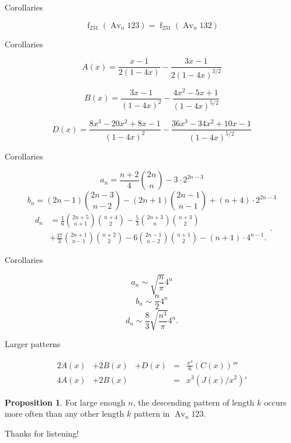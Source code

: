 \documentclass[xcolor=dvipsnames]{beamer}
\newcommand{\Avn}{\Av_n   123 }
\DeclareMathOperator{\Av}{Av}
\DeclareMathOperator{\num}{f}
\theoremstyle{definition}            %
\newtheorem*{proposition}{Proposition}
\begin{document}
\begin{frame}{Corollaries}
  \pause
  \begin{corollary}
    $$ \num_{231}(\Avn) = \num_{231}(\Av_n 132)$$
  \end{corollary}
\end{frame}


\begin{frame}{Corollaries}

    $$ A(x) = \frac{x-1}{2(1-4x)} - \frac{3x-1}{2(1-4x)^{3/2}}$$

    $$B(x) = \frac{3x-1}{(1-4x)^{2}} - \frac{4x^2 - 5x +
    1}{(1-4x)^{5/2}}$$

    $$ D(x) =   \frac{ 8x^3 - 20x^2 + 8x - 1}{(1-4x)^{2}} 
      - \frac{36x^3 - 34x^2 + 10x - 1}{(1-4x)^{5/2}} $$ 

\end{frame}




\begin{frame}{Corollaries}

    $$ a_n = \frac{n+2}{4} \binom{2n}{n} - 3 \cdot 2^{2n-3} $$
    \pause
    $$ b_n = (2n-1) \binom{2n-3}{n-2} - (2n+1)\binom{2n-1}{n-1} + 
       (n+4) \cdot 2^{2n-3}$$
    \pause
    $$ \begin{aligned} d_n 
        &= \frac{1}{6} \binom{2n+5}{n+1} \binom{n+4}{2} 
        - \frac{5}{3} \binom{2n+3}{n} \binom{n+3}{2} \\
        &+ \frac{17}{3} \binom{2n+1}{n-1} \binom{n+2}{2} 
        - 6\binom{2n-1}{n-2} \binom{n+1}{2} - (n+1) \cdot 4^{n-1}.
      \end{aligned}
    .$$

\end{frame}


\begin{frame}{Corollaries}

  $$ a_n \sim \sqrt{\frac{n}{\pi}} 4^n$$
  $$ b_n \sim \frac{n}{2} 4^n $$
  $$ d_n \sim \frac{8}{3} \sqrt{\frac{n^3}{\pi}} 4^n. $$

\end{frame}


\begin{frame}{Larger patterns}
  \pause
  \begin{lemma}
    $$ \begin{array}{ccccc}
      2A(x) & + 2B(x) & + D(x) & = & \frac{x^3}{6} (C(x))'''\\
      4A(x) & + 2B(x) & & =&  x^3(J(x)/x^2)' 
      \end{array} $$
  \end{lemma}
  \pause
  \begin{proposition}
    For large enough $n$, the descending pattern of length $k$ occurs
    more often than any other length $k$ pattern in $\Avn$. 
  \end{proposition}
\end{frame}



\begin{frame}
  \begin{block}{\hspace{6pc}\Large Thanks for listening!}
  \end{block}
\end{frame}
\end{document}
